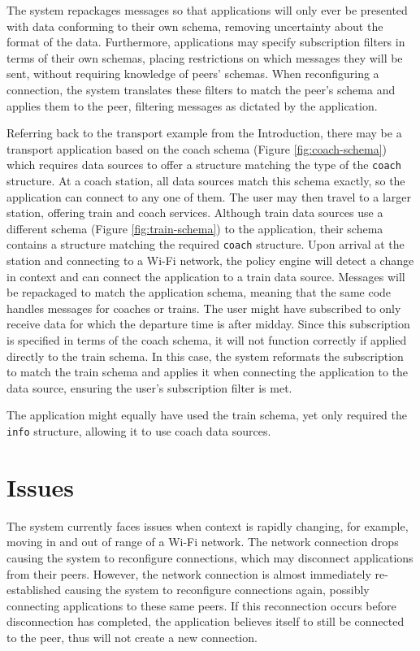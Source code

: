 \documentclass[12pt,twoside,notitlepage]{report}
\begin{document}
The system repackages messages so that applications will only ever be presented with data conforming to their own schema, removing uncertainty about the format of the data.
Furthermore, applications may specify subscription filters in terms of their own schemas, placing restrictions on which messages they will be sent, without requiring knowledge of peers' schemas.
When reconfiguring a connection, the system translates these filters to match the peer's schema and applies them to the peer, filtering messages as dictated by the application.

Referring back to the transport example from the Introduction, there may be a transport application based on the coach schema (Figure \ref{fig:coach-schema}) which requires data sources to offer a structure matching the type of the {\tt coach} structure. 
At a coach station, all data sources match this schema exactly, so the application can connect to any one of them. 
The user may then travel to a larger station, offering train and coach services. 
Although train data sources use a different schema (Figure \ref{fig:train-schema}) to the application, their schema contains a structure matching the required {\tt coach} structure.
Upon arrival at the station and connecting to a Wi-Fi network, the policy engine will detect a change in context and can connect the application to a train data source. 
Messages will be repackaged to match the application schema, meaning that the same code handles messages for coaches or trains.
The user might have subscribed to only receive data for which the departure time is after midday. 
Since this subscription is specified in terms of the coach schema, it will not function correctly if applied directly to the train schema. 
In this case, the system reformats the subscription to match the train schema and applies it when connecting the application to the data source, ensuring the user's subscription filter is met.

The application might equally have used the train schema, yet only required the {\tt info} structure, allowing it to use coach data sources.

\section{Issues}
The system currently faces issues when context is rapidly changing, for example, moving in and out of range of a Wi-Fi network. 
The network connection drops causing the system to reconfigure connections, which may disconnect applications from their peers.
However, the network connection is almost immediately re-established causing the system to reconfigure connections again, possibly connecting applications to these same peers. 
If this reconnection occurs before disconnection has completed, the application believes itself to still be connected to the peer, thus will not create a new connection.
\end{document}
